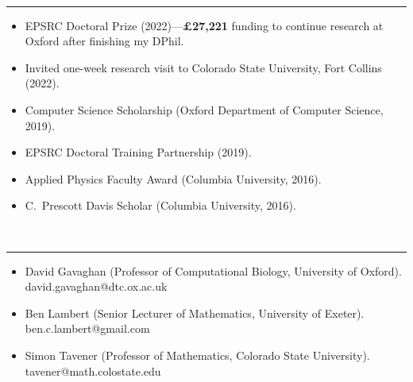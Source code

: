 \documentclass[11pt]{article}
\begin{document}
\vspace{-2.75mm} \\
\rule{\textwidth}{0.4pt}
\vspace{-.65cm}
\begin{itemize}[leftmargin=*]
\setlength{\itemsep}{4pt}
\setlength{\parskip}{0pt}
\setlength{\parsep}{0pt}
\item EPSRC Doctoral Prize (2022)---\textbf{£27,221} funding to continue research at Oxford after finishing my DPhil.
\item Invited one-week research visit to Colorado State University, Fort Collins (2022).
\item Computer Science Scholarship (Oxford Department of Computer Science, 2019).
\item EPSRC Doctoral Training Partnership (2019).
\item Applied Physics Faculty Award (Columbia University, 2016).
\item C.\ Prescott Davis Scholar (Columbia University, 2016).
\end{itemize}

\vspace{0.5cm}

\clearpage

\vspace{-2.75mm} \\
\rule{\textwidth}{0.4pt}
\vspace{-.65cm}
\begin{itemize}[leftmargin=*]
\setlength{\itemsep}{4pt}
\setlength{\parskip}{0pt}
\setlength{\parsep}{0pt}
\item David Gavaghan (Professor of Computational Biology, University of Oxford).\\ \hspace*{.5cm}david.gavaghan@dtc.ox.ac.uk

\item Ben Lambert (Senior Lecturer of Mathematics, University of Exeter).\\
\hspace*{.5cm}ben.c.lambert@gmail.com

\item Simon Tavener (Professor of Mathematics, Colorado State University).\\
\hspace*{.5cm}tavener@math.colostate.edu



\end{itemize}
\end{document}
